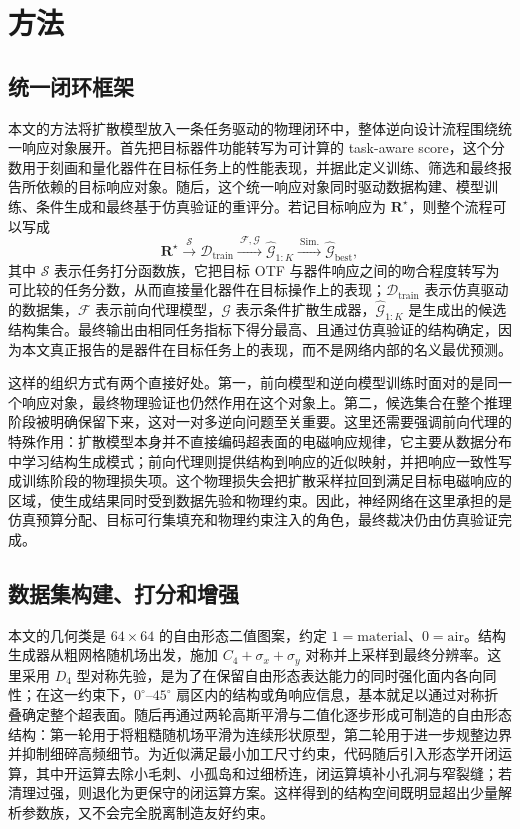\section{方法}

\subsection{统一闭环框架}

本文的方法将扩散模型放入一条任务驱动的物理闭环中，整体逆向设计流程围绕统一响应对象展开。首先把目标器件功能转写为可计算的 task-aware score，这个分数用于刻画和量化器件在目标任务上的性能表现，并据此定义训练、筛选和最终报告所依赖的目标响应对象。随后，这个统一响应对象同时驱动数据构建、模型训练、条件生成和最终基于仿真验证的重评分。若记目标响应为 $\mathbf{R}^{\star}$，则整个流程可以写成
\begin{equation}
\mathbf{R}^{\star}\xrightarrow{\ \mathcal{S}\ }\mathcal{D}_{\mathrm{train}}
\xrightarrow{\ \mathcal{F},\mathcal{G}\ }\widehat{\mathcal{G}}_{1:K}
\xrightarrow{\ \mathrm{Sim.}\ }\widehat{\mathcal{G}}_{\mathrm{best}},
\end{equation}
其中 $\mathcal{S}$ 表示任务打分函数族，它把目标 OTF 与器件响应之间的吻合程度转写为可比较的任务分数，从而直接量化器件在目标操作上的表现；$\mathcal{D}_{\mathrm{train}}$ 表示仿真驱动的数据集，$\mathcal{F}$ 表示前向代理模型，$\mathcal{G}$ 表示条件扩散生成器，$\widehat{\mathcal{G}}_{1:K}$ 是生成出的候选结构集合。最终输出由相同任务指标下得分最高、且通过仿真验证的结构确定，因为本文真正报告的是器件在目标任务上的表现，而不是网络内部的名义最优预测。

这样的组织方式有两个直接好处。第一，前向模型和逆向模型训练时面对的是同一个响应对象，最终物理验证也仍然作用在这个对象上。第二，候选集合在整个推理阶段被明确保留下来，这对一对多逆向问题至关重要。这里还需要强调前向代理的特殊作用：扩散模型本身并不直接编码超表面的电磁响应规律，它主要从数据分布中学习结构生成模式；前向代理则提供结构到响应的近似映射，并把响应一致性写成训练阶段的物理损失项。这个物理损失会把扩散采样拉回到满足目标电磁响应的区域，使生成结果同时受到数据先验和物理约束。因此，神经网络在这里承担的是仿真预算分配、目标可行集填充和物理约束注入的角色，最终裁决仍由仿真验证完成。

\subsection{数据集构建、打分和增强}

本文的几何类是 $64\times64$ 的自由形态二值图案，约定 $1=\mathrm{material}$、$0=\mathrm{air}$。结构生成器从粗网格随机场出发，施加 $C_4+\sigma_x+\sigma_y$ 对称并上采样到最终分辨率。这里采用 $D_4$ 型对称先验，是为了在保留自由形态表达能力的同时强化面内各向同性；在这一约束下，$0^{\circ}$--$45^{\circ}$ 扇区内的结构或角响应信息，基本就足以通过对称折叠确定整个超表面。随后再通过两轮高斯平滑与二值化逐步形成可制造的自由形态结构：第一轮用于将粗糙随机场平滑为连续形状原型，第二轮用于进一步规整边界并抑制细碎高频细节。为近似满足最小加工尺寸约束，代码随后引入形态学开闭运算，其中开运算去除小毛刺、小孤岛和过细桥连，闭运算填补小孔洞与窄裂缝；若清理过强，则退化为更保守的闭运算方案。这样得到的结构空间既明显超出少量解析参数族，又不会完全脱离制造友好约束。

